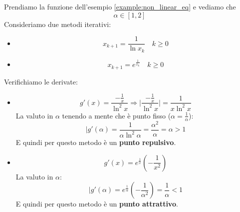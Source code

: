 \newpage
\begin{example}
	Prendiamo la funzione dell'esempio \ref{example:non_linear_eq} e vediamo che
	\begin{equation*}
		\alpha \in [1,2]
	\end{equation*}
	Consideriamo due metodi iterativi:
	\begin{itemize}
		\item
		\begin{equation*}
			x_{k+1} = \frac{1}{\ln {x_k}} \quad k \geq 0
		\end{equation*}
		\item 
		\begin{equation*}
			x_{k+1} = e^{\frac{1}{x_k}} \quad k \geq 0
		\end{equation*}
	\end{itemize}
	Verifichiamo le derivate:
	\begin{itemize}
		\item 
		\begin{equation*}
			g'(x) = \frac{- \frac{1}{x}}{\ln ^ 2 {x}} \Rightarrow \lvert \frac{- \frac{1}{x}}{\ln ^ 2 {x}} \rvert  = \frac{1}{x \ln^2 x}
		\end{equation*}
		La valuto in $\alpha$ tenendo a mente che è punto fisso ($\alpha = \frac{1}{\alpha}$):
		\begin{equation*}
			\lvert g'(\alpha)= \frac{1}{\alpha \ln ^2 \alpha} = \frac{\alpha^2}{\alpha} = \alpha > 1
		\end{equation*}
		E quindi per questo metodo è un \textbf{punto repulsivo}.
		\item \begin{equation*}
			g'(x) = e^\frac{1}{x}(-\frac{1}{x^2})
		\end{equation*}
		La valuto in $\alpha$:
		\begin{equation*}
			\lvert g'(\alpha)= e^\frac{1}{\alpha}(-\frac{1}{\alpha^2}) = \frac{1}{\alpha} < 1
		\end{equation*}
		E quindi per questo metodo è un \textbf{punto attrattivo}.
	\end{itemize}
\end{example}